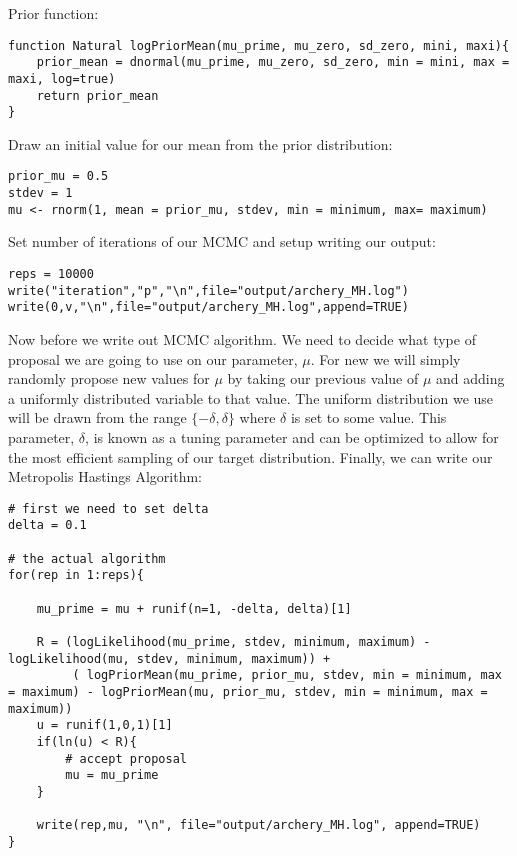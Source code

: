Prior function: 

{\tt \begin{snugshade*}
 \begin{lstlisting}
function Natural logPriorMean(mu_prime, mu_zero, sd_zero, mini, maxi){
	prior_mean = dnormal(mu_prime, mu_zero, sd_zero, min = mini, max = maxi, log=true)
	return prior_mean
}
\end{lstlisting}
\end{snugshade*}}



Draw an initial value for our mean from the prior distribution:

{\tt \begin{snugshade*}
 \begin{lstlisting}
prior_mu = 0.5
stdev = 1
mu <- rnorm(1, mean = prior_mu, stdev, min = minimum, max= maximum)
\end{lstlisting}
\end{snugshade*}}

Set number of iterations of our MCMC and setup writing our output:

{\tt \begin{snugshade*}
 \begin{lstlisting}
reps = 10000
write("iteration","p","\n",file="output/archery_MH.log")
write(0,v,"\n",file="output/archery_MH.log",append=TRUE)
\end{lstlisting}
\end{snugshade*}}


Now before we write out MCMC algorithm. We need to decide what type of proposal we are going to use on our parameter, $\mu$. For new we will simply randomly propose new values for $\mu$ by taking our previous value of $\mu$ and adding a uniformly distributed variable to that value. The uniform distribution we use will be drawn from the range $\{ -\delta, \delta \}$ where $\delta$ is set to some value. This parameter, $\delta$, is known as a tuning parameter and can be optimized to allow for the most efficient sampling of our target distribution. Finally, we can write our Metropolis Hastings Algorithm:

{\tt \begin{snugshade*}
 \begin{lstlisting}
# first we need to set delta
delta = 0.1 

# the actual algorithm
for(rep in 1:reps){

	mu_prime = mu + runif(n=1, -delta, delta)[1] 

	R = (logLikelihood(mu_prime, stdev, minimum, maximum) - logLikelihood(mu, stdev, minimum, maximum)) +
		 ( logPriorMean(mu_prime, prior_mu, stdev, min = minimum, max = maximum) - logPriorMean(mu, prior_mu, stdev, min = minimum, max = maximum)) 
	u = runif(1,0,1)[1] 
	if(ln(u) < R){
		# accept proposal
		mu = mu_prime 
	} 

	write(rep,mu, "\n", file="output/archery_MH.log", append=TRUE) 
} 

\end{lstlisting}
\end{snugshade*}}


